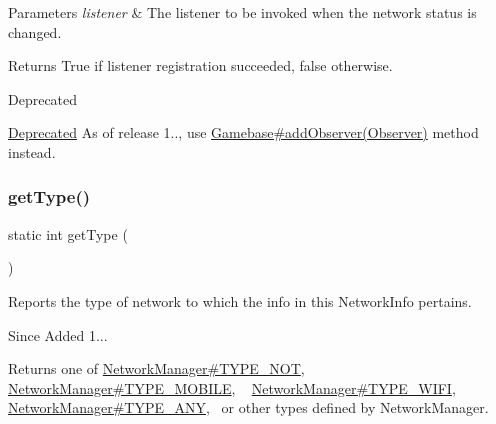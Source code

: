 \begin{DoxyParams}{Parameters}
{\em listener} & The listener to be invoked when the network status is changed. \\
\hline
\end{DoxyParams}
\begin{DoxyReturn}{Returns}
True if listener registration succeeded, false otherwise. 
\end{DoxyReturn}
\begin{DoxyRefDesc}{Deprecated}
\item[\hyperlink{deprecated__deprecated000006}{Deprecated}]As of release 1.., use \hyperlink{classcom_1_1toast_1_1android_1_1gamebase_1_1_gamebase_a9079ec835df5660d8b19a1fd3eb0d9d8}{Gamebase\#add\+Observer(\+Observer)} method instead. \end{DoxyRefDesc}
\mbox{\label{classcom_1_1toast_1_1android_1_1gamebase_1_1_gamebase_1_1_network_a266dfc4b57f7c115e6323b37841f9f83}} 
\subsubsection{\texorpdfstring{get\+Type()}{getType()}}
{\footnotesize\ttfamily static int get\+Type (\begin{DoxyParamCaption}{ }\end{DoxyParamCaption})\hspace{0.3cm}{\ttfamily [static]}}



Reports the type of network to which the info in this Network\+Info pertains. 

\begin{DoxySince}{Since}
Added 1... 
\end{DoxySince}
\begin{DoxyReturn}{Returns}
one of \hyperlink{}{Network\+Manager\#\+T\+Y\+P\+E\+\_\+\+N\+OT}, \hyperlink{}{Network\+Manager\#\+T\+Y\+P\+E\+\_\+\+M\+O\+B\+I\+LE}, ~\newline
 \hyperlink{}{Network\+Manager\#\+T\+Y\+P\+E\+\_\+\+W\+I\+FI}, \hyperlink{}{Network\+Manager\#\+T\+Y\+P\+E\+\_\+\+A\+NY},~\newline
 or other types defined by Network\+Manager. 
\end{DoxyReturn}
\mbox{\label{classcom_1_1toast_1_1android_1_1gamebase_1_1_gamebase_1_1_network_afc9b9c5fd3623a1bc4efb56deab90dbf}} 
